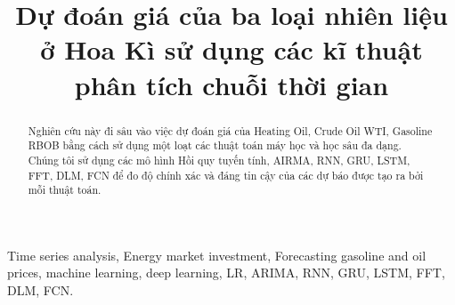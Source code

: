 \documentclass[conference]{IEEEtran}
\begin{document}
\title{Dự đoán giá của ba loại nhiên liệu ở Hoa Kì sử dụng các kĩ thuật phân tích chuỗi thời gian\\
}

\author{
\and
{}
\and
{}
\and
\hspace{2.5cm}
\and
{}
}

\maketitle

\begin{abstract}
Nghiên cứu này đi sâu vào việc dự đoán giá của Heating Oil, Crude Oil WTI, Gasoline RBOB bằng cách sử dụng một loạt các thuật toán máy học và học sâu đa dạng. Chúng tôi sử dụng các mô hình Hồi quy tuyến tính, AIRMA, RNN, GRU, LSTM, FFT, DLM, FCN để đo độ chính xác và đáng tin cậy của các dự báo được tạo ra bởi mỗi thuật toán.
\end{abstract}

\begin{IEEEkeywords}
Time series analysis, Energy market investment, Forecasting gasoline and oil prices, machine learning, deep learning, LR, ARIMA, RNN, GRU, LSTM, FFT, DLM, FCN.\end{IEEEkeywords}
\end{document}
